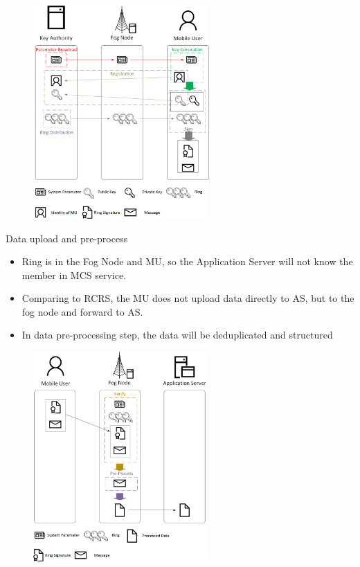 \documentclass{beamer}
\begin{document}
\begin{frame}{}
    \begin{figure}[t]
        \centering
        \includegraphics[width=0.6\textwidth]{figures/2.png}
        
    \end{figure}
\end{frame}
\begin{frame}{Data upload and pre-process}
    \begin{itemize}
        \item {Ring is in the Fog Node and MU, so the Application Server will not know the member in MCS service.}
        \item {Comparing to RCRS, the MU does not upload data directly to AS, but to the fog node and forward to AS.}
        \item {In data pre-processing step, the data will be deduplicated and structured}
    \end{itemize}
\end{frame}
\begin{frame}{}
    \begin{figure}[t]
        \centering
        \includegraphics[width=0.6\textwidth]{figures/3.png}
        
    \end{figure}
\end{frame}
\end{document}
